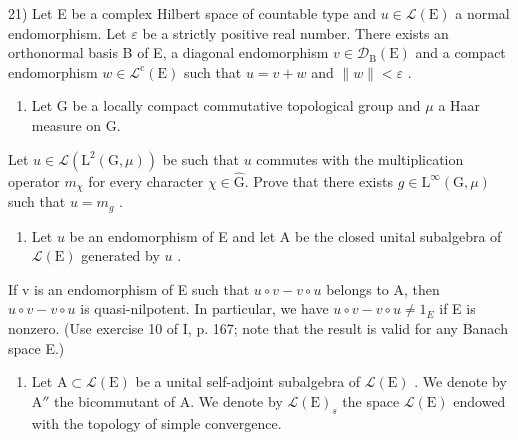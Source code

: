21) Let E be a complex Hilbert space of countable type and \(u \in \mathcal{L}(\mathrm{E})\) a normal endomorphism. Let \(\varepsilon\) be a strictly positive real number. There exists an orthonormal basis B of E, a diagonal endomorphism \(v \in \mathcal{D}_{\mathrm{B}}(\mathrm{E})\) and a compact endomorphism \(w \in \mathcal{L}^{\mathrm{c}}(\mathrm{E})\) such that \(u = v + w\) and \(\|w\| < \varepsilon\) .

\begin{enumerate}
\def\labelenumi{\arabic{enumi})}
\setcounter{enumi}{21}
\tightlist
\item
  Let G be a locally compact commutative topological group and \(\mu\) a Haar measure on G.
\end{enumerate}

Let \(u \in \mathcal{L}(\mathrm{L}^2(\mathrm{G},\mu))\) be such that \(u\) commutes with the multiplication operator \(m_{\chi}\) for every character \(\chi \in \widehat{\mathrm{G}}\). Prove that there exists \(g \in \mathrm{L}^{\infty}(\mathrm{G},\mu)\) such that \(u = m_g\) .

\begin{enumerate}
\def\labelenumi{\arabic{enumi})}
\setcounter{enumi}{22}
\tightlist
\item
  Let \(u\) be an endomorphism of E and let A be the closed unital subalgebra of \(\mathcal{L}(\mathrm{E})\) generated by \(u\) .
\end{enumerate}

If v is an endomorphism of E such that \(u \circ v - v \circ u\) belongs to A, then \(u \circ v - v \circ u\) is quasi-nilpotent. In particular, we have \(u \circ v - v \circ u \neq 1_{E}\) if E is nonzero. (Use exercise 10 of I, p. 167; note that the result is valid for any Banach space E.)

\begin{enumerate}
\def\labelenumi{\arabic{enumi})}
\setcounter{enumi}{23}
\tightlist
\item
  Let \(\mathrm{A} \subset \mathcal{L}(\mathrm{E})\) be a unital self-adjoint subalgebra of \(\mathcal{L}(\mathrm{E})\) . We denote by \(\mathrm{A}''\) the bicommutant of A. We denote by \(\mathcal{L}(\mathrm{E})_s\) the space \(\mathcal{L}(\mathrm{E})\) endowed with the topology of simple convergence.
\end{enumerate}

